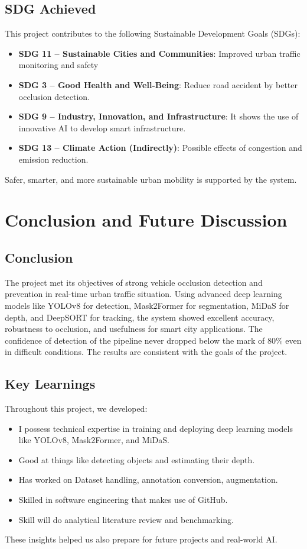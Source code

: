 \documentclass[12pt,a4paper]{report}
\theoremstyle{definition}
\theoremstyle{remark}
\begin{document}
\section{SDG Achieved}

This project contributes to the following Sustainable Development Goals (SDGs):
\begin{itemize}
    \item \textbf{SDG 11 – Sustainable Cities and Communities}: Improved urban traffic monitoring and safety
    \item \textbf{SDG 3 – Good Health and Well-Being}: Reduce road accident by better occlusion detection.
    \item \textbf{SDG 9 – Industry, Innovation, and Infrastructure}: It shows the use of innovative AI to develop smart infrastructure.
    \item \textbf{SDG 13 – Climate Action (Indirectly)}: Possible effects of congestion and emission reduction.
\end{itemize}
Safer, smarter, and more sustainable urban mobility is supported by the system.

\chapter{Conclusion and Future Discussion}

\section{Conclusion}
The project met its objectives of strong vehicle occlusion detection and prevention in real-time urban traffic situation. Using advanced deep learning models like YOLOv8 for detection, Mask2Former for segmentation, MiDaS for depth, and DeepSORT for tracking, the system showed excellent accuracy, robustness to occlusion, and usefulness for smart city applications. The confidence of detection of the pipeline never dropped below the mark of 80\% even in difficult conditions. The results are consistent with the goals of the project.

\section{Key Learnings}
Throughout this project, we developed:
\begin{itemize}
    \item I possess technical expertise in training and deploying deep learning models like YOLOv8, Mask2Former, and MiDaS.
    \item Good at things like detecting objects and estimating their depth.
    \item Has worked on Dataset handling, annotation conversion, augmentation.
    \item Skilled in software engineering that makes use of GitHub. 
    \item Skill will do analytical literature review and benchmarking.
\end{itemize}
These insights helped us also prepare for future projects and real-world AI.
\end{document}
